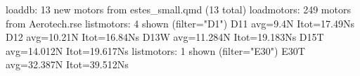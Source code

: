 \begin{console}
\ok loaddb: 13 new motors from estes_small.qmd (13 total)
\ok loadmotors: 249 motors from Aerotech.rse
\ok listmotors: 4 shown (filter="D1")
D11  avg=9.4N  Itot=17.49Ns
D12  avg=10.21N  Itot=16.84Ns
D13W  avg=11.284N  Itot=19.183Ns
D15T  avg=14.012N  Itot=19.617Ns
\ok listmotors: 1 shown (filter="E30")
E30T  avg=32.387N  Itot=39.512Ns
\end{console}
